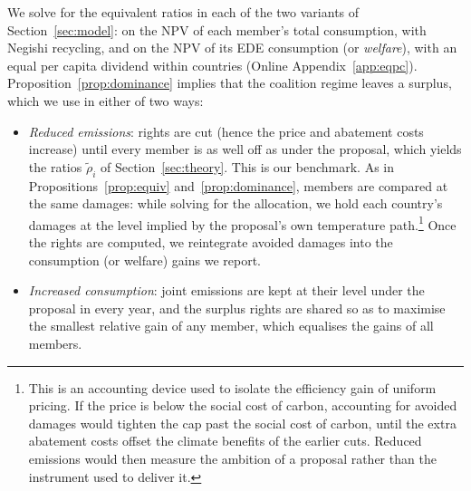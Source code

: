 \documentclass[12pt,english]{article}
\theoremstyle{remark}
\begin{document}
We solve for the equivalent ratios in each of the two variants of Section~\ref{sec:model}: on the NPV of each member's total consumption, with Negishi recycling, and on the NPV of its EDE consumption (or \textit{welfare}), with an equal per capita dividend within countries (Online Appendix~\ref{app:eqpc}). Proposition~\ref{prop:dominance} implies that the coalition regime leaves a surplus, which we use in either of two ways:
\begin{itemize}
  \item \emph{Reduced emissions}: rights are cut (hence the price and abatement costs increase) until every member is as well off as under the proposal, which yields the ratios $\tilde\rho_i$ of Section~\ref{sec:theory}. This is our benchmark. %
  As in Propositions~\ref{prop:equiv} and~\ref{prop:dominance}, members are compared at the same damages: while solving for the allocation, we hold each country's damages at the level implied by the proposal's own temperature path.\footnote{This is an accounting device used to isolate the efficiency gain of uniform pricing. If the price is below the social cost of carbon, accounting for avoided damages would tighten the cap past the social cost of carbon, until the extra abatement costs offset the climate benefits of the earlier cuts.
  Reduced emissions would then measure the ambition of a proposal rather than the instrument used to deliver it.} 
  Once the rights are computed, we reintegrate avoided damages into the consumption (or welfare) gains we report. 
  \item \emph{Increased consumption}: joint emissions are kept at their level under the proposal in every year, and the surplus rights are shared so as to maximise the smallest relative gain of any member, which equalises the gains of all members.
\end{itemize}
\end{document}
